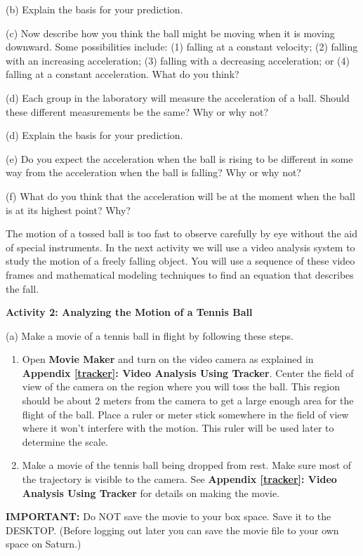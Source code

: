 (b) Explain the basis for your prediction.
\vspace{20mm}

(c) Now describe how you think the ball might be moving when it is moving downward. Some possibilities include: (1) falling at a constant velocity; (2) falling
with an increasing acceleration; (3) falling with a decreasing acceleration;
or (4) falling at a constant acceleration. What do you think?
\vspace{20mm}

(d) Each group in the laboratory will measure the acceleration of a ball. Should these different measurements be the same? Why or why not?
\vspace{20mm}

(d) Explain the basis for your prediction.
\vspace{20mm}

(e) Do you expect the acceleration when the ball is rising to be different in
some way from the acceleration when the ball is falling? Why or why not?
\vspace{20mm}

(f) What do you think that the acceleration will be at the moment when the ball
is at its highest point? Why?
\vspace{20mm}

The motion of a tossed ball is too fast to observe carefully by eye without
the aid of special instruments. In the next activity we will use a video analysis system to study the motion of a freely falling object. You will use a sequence of these video frames and mathematical modeling techniques to find an equation that describes the fall. 

\textbf{Activity 2: Analyzing the Motion of a Tennis Ball} 

(a) Make a movie of a tennis ball in flight by following these steps.

\begin{enumerate}
\item Open \textbf{Movie Maker} and turn on the video camera as explained in \textbf{Appendix \ref{tracker}: Video Analysis Using Tracker}. Center the field of view of the camera on the region where you will toss the ball. This region should be about 2 meters from the camera to get a large enough area for the flight of the ball. Place a ruler or meter stick somewhere in the field of view where it won't interfere with the motion. This ruler will be used later to determine the scale. 
\item Make a movie of the tennis ball being dropped from rest. Make sure most of the trajectory is visible to the camera. See \textbf{Appendix \ref{tracker}: Video Analysis Using Tracker} for 
details on making the movie.
\end{enumerate}
\textbf{IMPORTANT:} Do NOT save the movie to your box space.  Save it to the DESKTOP.  (Before logging out later you can save the movie file to your own space on Saturn.)
\vspace{5mm}

